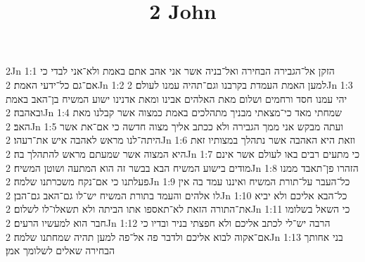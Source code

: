 

\title{2 John}

2Jn 1:1  הזקן אל־הגבירה הבחירה ואל־בניה אשר אני אהב אתם באמת ולא־אני לבדי כי אם־גם כל־ידעי האמת׃
2Jn 1:2  למען האמת העמדת בקרבנו וגם־תהיה עמנו לעולם׃
2Jn 1:3  יהי עמנו חסד ורחמים ושלום מאת האלהים אבינו ומאת אדנינו ישוע המשיח בן־האב באמת ובאהבה׃
2Jn 1:4  שמחתי מאד כי־מצאתי מבניך מתהלכים באמת כמצוה אשר קבלנו מאת האב׃
2Jn 1:5  ועתה מבקש אני ממך הגבירה ולא ככתב אליך מצוה חדשה כי אם־את אשר היתה־לנו מראש לאהבה איש את־רעהו׃
2Jn 1:6  וזאת היא האהבה אשר נתהלך במצותיו זאת היא המצוה אשר שמעתם מראש להתהלך בה׃
2Jn 1:7  כי מתעים רבים באו לעולם אשר אינם מודים בישוע המשיח הבא בבשר זה הוא המתעה ושוטן המשיח׃
2Jn 1:8  הזהרו פן־תאבד ממנו פעלתנו כי אם־נקח משכרתנו שלמה׃
2Jn 1:9  כל־העבר על־תורת המשיח ואיננו עמד בה אין לו אלהים והעמד בתורת המשיח יש־לו גם־האב גם־הבן׃
2Jn 1:10  כל־הבא אליכם ולא יביא את־התורה הזאת לא־תאספו אתו הביתה ולא תשאלו־לו לשלום׃
2Jn 1:11  כי השאל בשלומו חבר הוא למעשיו הרעים׃
2Jn 1:12  הרבה יש־לי לכתב אליכם ולא חפצתי בניר ובדיו כי אם־אקוה לבוא אליכם ולדבר פה אל־פה למען תהיה שמחתנו שלמה׃
2Jn 1:13  בני אחותך הבחירה שאלים לשלומך אמן׃


